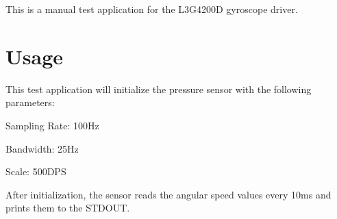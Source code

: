 This is a manual test application for the L3\+G4200D gyroscope driver.

\section*{Usage}

This test application will initialize the pressure sensor with the following parameters\+:
\begin{DoxyItemize}
\item Sampling Rate\+: 100\+Hz
\item Bandwidth\+: 25\+Hz
\item Scale\+: 500\+D\+PS
\end{DoxyItemize}

After initialization, the sensor reads the angular speed values every 10ms and prints them to the S\+T\+D\+O\+UT. 